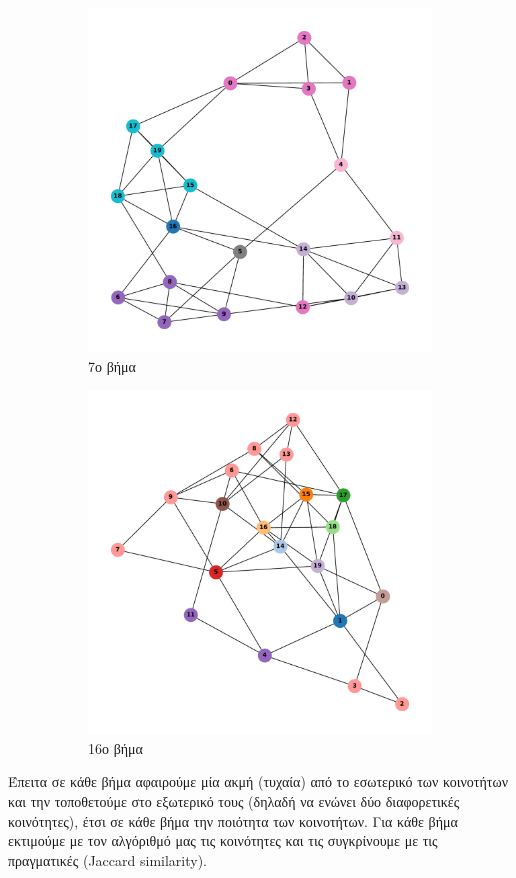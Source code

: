 \documentclass[12pt, letterpaper]{article}
\begin{document}
\begin{figure}
  \begin{subfigure}{0.5\textwidth}
    \centering
    \includegraphics[width=0.6\linewidth]{iterations=6.pdf}
    \caption{7ο βήμα}
    \label{fig:it6}
  \end{subfigure}
  \begin{subfigure}{0.5\textwidth}
    \centering
    \includegraphics[width=0.6\linewidth]{iterations=15.pdf}
    \caption{16ο βήμα}
    \label{fig:it15}
  \end{subfigure}
  \caption{}
  \label{}
\end{figure}




Έπειτα σε κάθε βήμα αφαιρούμε μία ακμή (τυχαία) από το εσωτερικό των κοινοτήτων και την 
τοποθετούμε στο εξωτερικό τους (δηλαδή να ενώνει δύο διαφορετικές κοινότητες), έτσι 
 σε κάθε βήμα την ποιότητα των κοινοτήτων. Για κάθε βήμα εκτιμούμε με τον 
αλγόριθμό μας τις κοινότητες και τις συγκρίνουμε με τις πραγματικές (\textlatin{Jaccard similarity}).
\end{document}
